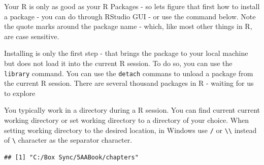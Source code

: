 \documentclass[11pt, letterpaper, twoside]{memoir}\usepackage{knitr}
\begin{document}
Your R is only as good as your R Packages - so lets figure that first how to install a package - you can do through RStudio GUI - or use the command below. Note the quote marks around the package name - which, like most other things in R, are case sensitive.
\begin{knitrout}
\color{fgcolor}\begin{kframe}
\begin{alltt}
\hlstd{(}\hlstd{)}
\end{alltt}
\end{kframe}
\end{knitrout}

Installing is only the first step - that brings the package to your local machine but does not load it into the current R session. To do so, you can use the \texttt{library} command. You can use the \texttt{detach} commans to unload a package from the current R session. There are several thousand packages in R - waiting for us to explore
\begin{knitrout}
\color{fgcolor}\begin{kframe}
\begin{alltt}
\end{alltt}


{\ttfamily\noindent\color{warningcolor}{\#\# Warning: package 'ggplot2' was built under R version 3.3.1}}\begin{alltt}
\hlopt{:}
\end{alltt}
\end{kframe}
\end{knitrout}

You typically work in a directory during a R session. You can find current current working directory or set working directory to a directory of your choice. 
When setting working directory to the desired location, in Windows use \verb|/| or \verb|\\| instead of \verb|\| character as the separator character. 
\begin{knitrout}
\color{fgcolor}\begin{kframe}
\begin{alltt}
\hlstd{()}
\end{alltt}
\begin{verbatim}
## [1] "C:/Box Sync/5AABook/chapters"
\end{verbatim}
\end{kframe}
\end{knitrout}
\begin{knitrout}
\color{fgcolor}\begin{kframe}
\begin{alltt}
\hlstd{(}\hlstd{)}
\end{alltt}
\end{kframe}
\end{knitrout}
\end{document}
